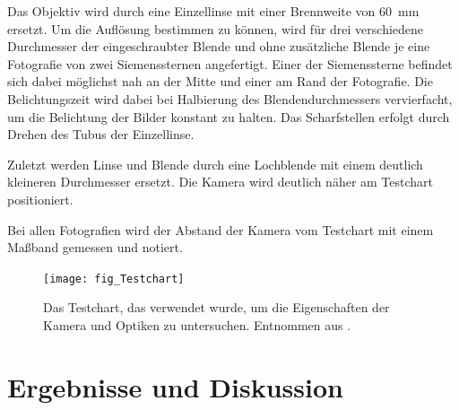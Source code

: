 \documentclass[
	a4paper,
	12pt,
	pagesize,
	ngerman
]{scrartcl}
\begin{document}
	Das Objektiv wird durch eine Einzellinse mit einer Brennweite von \SI{60}{\milli \meter} ersetzt.
	Um die 	Auflösung bestimmen zu können, wird für drei verschiedene Durchmesser der eingeschraubter Blende und ohne zusätzliche Blende je eine Fotografie von zwei Siemenssternen angefertigt.
	Einer der Siemenssterne befindet sich dabei möglichst nah an der Mitte und einer am Rand der Fotografie.
	Die Belichtungszeit wird dabei bei Halbierung des Blendendurchmessers vervierfacht, um die Belichtung der Bilder konstant zu halten. %
	Das Scharfstellen erfolgt durch Drehen des Tubus der Einzellinse.
	
	Zuletzt werden Linse und Blende durch eine Lochblende mit einem deutlich kleineren Durchmesser ersetzt. %
	Die Kamera wird deutlich näher am Testchart positioniert.
	
	Bei allen Fotografien wird der Abstand der Kamera vom Testchart mit einem Maßband gemessen und notiert.
	\begin{figure}[H] 
		\texttt{[image: fig\_Testchart]}
		\centering
		\caption{Das Testchart, das verwendet wurde, um die Eigenschaften der Kamera und Optiken zu untersuchen. Entnommen aus \cite{Testchart}.} %
		\label{fig_testchart}
		\centering
	\end{figure}
	\section{Ergebnisse und Diskussion}
	
\end{document}
